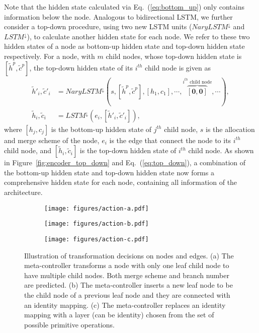 \documentclass{article}
\newcommand{\bs}{\boldsymbol}
\begin{document}
Note that the hidden state calculated via Eq.~(\ref{eq:bottom_up}) only contains information below the node. Analogous to bidirectional LSTM, we further consider a top-down procedure, using two new LSTM units ($NaryLSTM^\downarrow$ and $LSTM^\downarrow$), to calculate another hidden state for each node. We refer to these two hidden states of a node as bottom-up hidden state and top-down hidden state respectively. For a node, with $m$ child nodes, whose top-down hidden state is $[\tilde{h}^p, \tilde{c}^p]$, the top-down hidden state of its $i^{th}$ child node is given as
{\small
\begin{align}\label{eq:top_down}
	\tilde{h}'_i, \tilde{c}'_i &= NaryLSTM^\downarrow(s, [\tilde{h}^p, \tilde{c}^p], [h_1, c_1], \cdots,  \!\!\!\! \overbrace{[\bs{0}, \bs{0}]}^{\text{$i^{th}$ child node}} \!\!\!\!, \cdots), \nonumber \\
	\tilde{h}_i, \tilde{c}_i &= LSTM^\downarrow(e_i, [\tilde{h}'_i, \tilde{c}'_i]),
\end{align}
}where $[h_j, c_j]$ is the bottom-up hidden state of $j^{th}$ child node, $s$ is the allocation and merge scheme of the node, $e_i$ is the edge that connect the node to its $i^{th}$ child node, and $[\tilde{h}_i, \tilde{c}_i]$ is the top-down hidden state of $i^{th}$ child node. As shown in Figure~\ref{fig:encoder_top_down} and Eq.~(\ref{eq:top_down}), a combination of the bottom-up hidden state and top-down hidden state now forms a comprehensive hidden state for each node, containing all information of the architecture. 

\begin{figure}[t]
	\centering
\begin{subfigure}{0.32\linewidth}
		\centering
		\texttt{[image: figures/action-a.pdf]}
		\caption{}
		\label{fig:action-a}
		\vspace{-0pt}
	\end{subfigure}
\begin{subfigure}{0.32\linewidth}
		\centering
		\hspace{10pt}
		\texttt{[image: figures/action-b.pdf]}
		\caption{}
		\label{fig:action-b}
		\vspace{-0pt}
	\end{subfigure}	
\begin{subfigure}{0.32\linewidth}
		\centering
		\texttt{[image: figures/action-c.pdf]}
		\caption{}
		\label{fig:action-c}
		\vspace{-0pt}
	\end{subfigure}	
	\caption{
		Illustration of transformation decisions on nodes and edges. (a) The meta-controller transforms a node with only one leaf child node to have multiple child nodes. Both merge scheme and branch number are predicted.  (b) The meta-controller inserts a new leaf node to be the child node of a previous leaf node and they are connected with an identity mapping. (c) The meta-controller replaces an identity mapping with a layer (can be identity) chosen from the set of possible primitive operations.
	}
	\label{fig:actions}
\end{figure}
\end{document}
